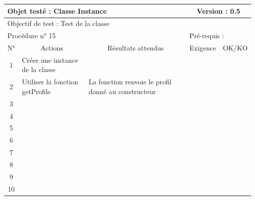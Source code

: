 \documentclass{../res/univ-projet}
\begin{document}
\begin{center}
    \begin{tabular}{|c|p{5cm}|p{5cm}|p{1.5cm}|p{1.5cm}|}
      \hline
      \multicolumn{3}{|l|}{Objet testé : Classe Instance} & \multicolumn{2}{c|}{Version : 0.5}\\ \hline
      \multicolumn{5}{|l|}{Objectif de test : Test de la classe}\\ \hline
      \multicolumn{3}{|l|}{Procédure n° 15} & \multicolumn{2}{p{3cm}|}{Pré-requis : }\\ \hline
      \multicolumn{1}{|c|}{N°} & \multicolumn{1}{c|}{Actions} & \multicolumn{1}{c|}{Résultats attendus} & 
      \multicolumn{1}{c|}{Exigence} & \multicolumn{1}{c|}{OK/KO}\\ \hline
      1 & Créer une instance de la classe &  &  & \\
      2 & Utiliser la fonction getProfile & La fonction renvoie le profil donné au constructeur &  & \\
      3 &  &  &  & \\
      4 &  &  &  & \\
      5 &  &  &  & \\
	  6 &  &  &  & \\
      7 &  &  &  & \\
      8 &  &  &  & \\
      9 &  &  &  & \\
      10 &  &  &  &\\ 
	\hline
    \end{tabular}
    \vskip 2.2cm


\end{center}
\end{document}
